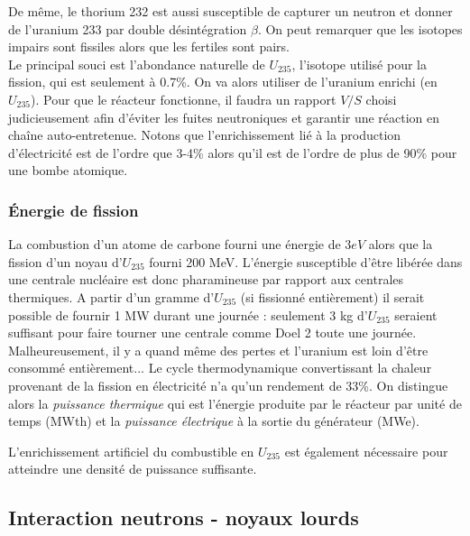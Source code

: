 De même, le thorium 232 est aussi susceptible de capturer un neutron et donner de l'uranium 233 par 
double désintégration $\beta$. On peut remarquer que les isotopes impairs sont fissiles alors que les
fertiles sont pairs.\\

Le principal souci est l'abondance naturelle de $U_{235}$, l'isotope utilisé pour la fission, qui est seulement à 0.7\%. 
On va alors utiliser de l'uranium enrichi (en $U_{235}$). Pour que le réacteur fonctionne, il faudra un rapport $V/S$ 
choisi judicieusement afin d'éviter les fuites neutroniques et garantir une réaction en chaîne auto-entretenue. Notons 
que l'enrichissement lié à la production d'électricité est de l'ordre que 3-4\% alors qu'il est de l'ordre de
plus de 90\% pour une bombe atomique.

\subsubsection{Énergie de fission}
La combustion d'un atome de carbone fourni une énergie de $3eV$ alors que la fission d'un noyau 
d'$U_{235}$ fourni 200 MeV. L'énergie susceptible d'être libérée dans une centrale nucléaire est donc pharamineuse par rapport 
aux centrales thermiques. A partir d'un gramme d'$U_{235}$ (si fissionné entièrement) il serait possible 
de fournir  1 MW durant une journée : seulement 3 kg d'$U_{235}$ seraient suffisant pour faire tourner 
une centrale comme Doel 2 toute une journée.\\

Malheureusement, il y a quand même des pertes et l'uranium est loin d'être consommé entièrement... 
Le cycle thermodynamique convertissant la chaleur provenant de la fission en électricité n'a qu'un rendement de 33\%.
On distingue alors la \textit{puissance thermique} qui est l'énergie produite par le réacteur par unité de temps (MWth)
et la \textit{puissance électrique} à la sortie du générateur (MWe).

L'enrichissement artificiel du combustible en $U_{235}$ est également nécessaire pour atteindre une densité de puissance suffisante.


\subsection{Interaction neutrons - noyaux lourds}
